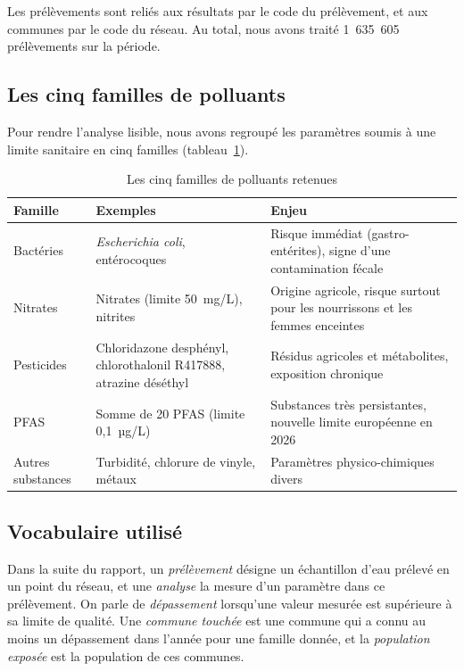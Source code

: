 \documentclass[11pt,a4paper]{article}
\begin{document}
Les prélèvements sont reliés aux résultats par le code du prélèvement, et aux communes par le code du réseau. Au total, nous avons traité 1~635~605 prélèvements sur la période.

\subsection{Les cinq familles de polluants}

Pour rendre l'analyse lisible, nous avons regroupé les paramètres soumis à une limite sanitaire en cinq familles (tableau~\ref{tab:familles}).

\begin{table}[H]
\centering
\small
\begin{tabular}{>{\raggedright}p{2.6cm} >{\raggedright}p{4.6cm} >{\raggedright\arraybackslash}p{6.6cm}}
\toprule
Famille & Exemples & Enjeu \\
\midrule
Bactéries & \textit{Escherichia coli}, entérocoques & Risque immédiat (gastro-entérites), signe d'une contamination fécale \\
Nitrates & Nitrates (limite 50~mg/L), nitrites & Origine agricole, risque surtout pour les nourrissons et les femmes enceintes \\
Pesticides & Chloridazone desphényl, chlorothalonil R417888, atrazine déséthyl & Résidus agricoles et métabolites, exposition chronique \\
PFAS & Somme de 20 PFAS (limite 0,1~µg/L) & Substances très persistantes, nouvelle limite européenne en 2026 \\
Autres substances & Turbidité, chlorure de vinyle, métaux & Paramètres physico-chimiques divers \\
\bottomrule
\end{tabular}
\caption{Les cinq familles de polluants retenues}
\label{tab:familles}
\end{table}

\subsection{Vocabulaire utilisé}

Dans la suite du rapport, un \textit{prélèvement} désigne un échantillon d'eau prélevé en un point du réseau, et une \textit{analyse} la mesure d'un paramètre dans ce prélèvement. On parle de \textit{dépassement} lorsqu'une valeur mesurée est supérieure à sa limite de qualité. Une \textit{commune touchée} est une commune qui a connu au moins un dépassement dans l'année pour une famille donnée, et la \textit{population exposée} est la population de ces communes.
\end{document}
